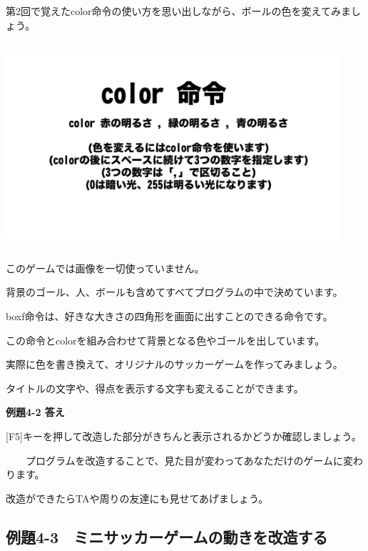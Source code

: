 \documentclass[a4paper,12pt]{jarticle}
\begin{document}
第2回で覚えたcolor命令の使い方を思い出しながら、ボールの色を変えてみましょう。

\bigskip
\bigskip

\begin{minipage}{9.781cm}
\centering
{\upshape
\includegraphics[keepaspectratio,width=12.409cm,height=7.62cm]{text04-img/text04-img009.png}}
\end{minipage}

\bigskip
\bigskip
\bigskip

このゲームでは画像を一切使っていません。

背景のゴール、人、ボールも含めてすべてプログラムの中で決めています。

boxf命令は、好きな大きさの四角形を画面に出すことのできる命令です。

この命令とcolorを組み合わせて背景となる色やゴールを出しています。

\bigskip

実際に色を書き換えて、オリジナルのサッカーゲームを作ってみましょう。

タイトルの文字や、得点を表示する文字も変えることができます。

\bigskip

\bigskip

{\bfseries
例題4-2 答え}

\bigskip

[F5]キーを押して改造した部分がきちんと表示されるかどうか確認しましょう。

\ \ \ \ プログラムを改造することで、見た目が変わってあなただけのゲームに変わります。

改造ができたらTAや周りの友達にも見せてあげましょう。

\bigskip

\bigskip

\clearpage
\subsection{例題4-3　ミニサッカーゲームの動きを改造する}
\bigskip
\bigskip
\end{document}
